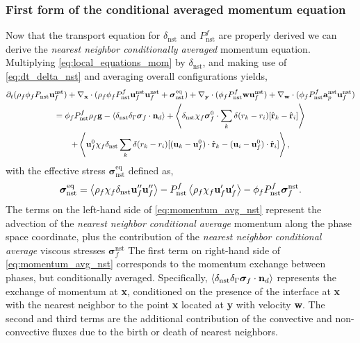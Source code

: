 \subsubsection{First form of the conditional averaged momentum equation}
Now that the transport equation for $\delta_\text{nst}$ and $P_\text{nst}^f$ are properly derived we can derive the \textit{nearest neighbor conditionally averaged} momentum equation. 
Multiplying \ref{eq:local_equations_mom} by $\delta_\text{nst}$, and making use of \ref{eq:dt_delta_nst} and averaging overall configurations yields, 
\begin{multline}
    \pddt (\rho_f\phi_f P_\text{nst} \textbf{u}^\text{nst}_f)
    + \pddx\cdot (
        \rho_f\phi_fP_\text{nst}^f \textbf{u}^\text{nst}_f\textbf{u}^\text{nst}_f 
        +\bm\sigma_\text{nst}^\text{eq})
    + \pddy\cdot (\phi_fP_\text{nst}^f \textbf{w}\textbf{u}_f^\text{nst} )
    + \pddw\cdot (\phi_fP_\text{nst}^f \textbf{a}_p^\text{nst} \textbf{u}_f^\text{nst} )\\
    = 
    \phi_fP_\text{nst}^f  \rho_f \textbf{g}
    - \avg{\delta_\text{nst}\delta_\Gamma \bm\sigma_f \cdot \textbf{n}_d} 
    +\avg{
        \delta_\text{nst}
        \chi_f \bm\sigma_f^0 \cdot
        \sum_k 
        \delta(r_k - r_i)
        [\hat{\textbf{r}}_k - \hat{\textbf{r}}_i]}\\
    +\avg{
         \textbf{u}_f^0\chi_f \delta_\text{nst}
        \sum_k 
        \delta(r_k - r_i)
        [(\textbf{u}_k - \textbf{u}_f^0) \cdot \hat{\textbf{r}}_k - (\textbf{u}_i- \textbf{u}_f^0)  \cdot \hat{\textbf{r}}_i]},
    \label{eq:momentum_avg_nst}
\end{multline}
with the effective stress $\bm\sigma_\text{nst}^\text{eq}$ defined as, 
\begin{equation}
    \bm\sigma_\text{nst}^\text{eq}=
    \left<\rho_f\chi_f\delta_\text{nst} \textbf{u}''_f\textbf{u}''_f\right> 
    - P_\text{nst}^f \left<\rho_f\chi_f\textbf{u}'_f\textbf{u}'_f\right> 
    - \phi_f P_\text{nst}^f \bm\sigma^\text{nst}_f. 
\end{equation}
The terms on the left-hand side of \ref{eq:momentum_avg_nst} represent the advection of the \textit{nearest neighbor conditional average} momentum along the phase space coordinate, plus the contribution of the \textit{nearest neighbor conditional average} viscous stresses $\bm\sigma^\text{nst}_f$
The first term on right-hand side of \ref{eq:momentum_avg_nst} corresponds to the momentum exchange between phases, but conditionally averaged. 
Specifically, $\left<\delta_\text{nst}\delta_\Gamma \bm\sigma_f \cdot \textbf{n}_d\right> $ represents the exchange of momentum at \textbf{x}, conditioned on the presence of the interface at \textbf{x} with the nearest neighbor to the point \textbf{x} located at \textbf{y} with velocity \textbf{w}.
The second and third terms are the additional contribution of the convective and non-convective fluxes due to the birth or death of nearest neighbors. 

